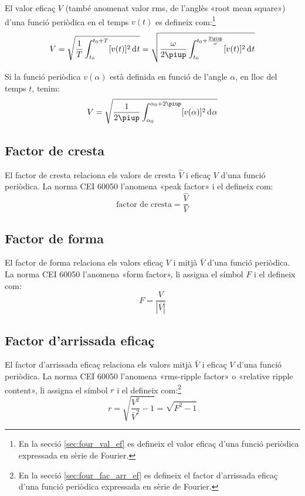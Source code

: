 El valor eficaç  $V$ (també anomenat valor rms, de l'anglès «root
mean square») d'una funció periòdica en el temps $v(t)$ es defineix com:\footnote{En la secció \ref{sec:four_val_ef} es defineix el valor eficaç d'una funció periòdica expressada en sèrie de Fourier.}
\begin{equation}
    V = \sqrt{\frac{1}{T} \int_{t_0}^{t_0+T} [v(t)]^2 \diff
    t} = \sqrt{\frac{\omega}{2\piup} \int_{t_0}^{t_0+\frac{2\piup}{\omega}}
     [v(t)]^2 \diff t}
\end{equation}

Si la funció periòdica $v(\alpha)$ està definida en funció de
l'angle $\alpha$, en lloc del temps $t$, tenim:
\begin{equation}
    V = \sqrt{\frac{1}{2\piup} \int_{\alpha_0}^{\alpha_0+2\piup}
     [v(\alpha)]^2 \diff \alpha}
\end{equation}

\subsection{Factor de cresta}

El factor de cresta relaciona els valors de cresta $\hat{V}$
  i eficaç $V$ d'una funció periòdica. La norma CEI 60050 l'anomena «peak factor» i el defineix com:
\begin{equation}
     \text{factor de cresta} = \frac{\hat{V}}{V}
\end{equation}

\subsection{Factor de forma}

El factor de forma relaciona els valors eficaç $V$
i mitjà $\bar{V}$ d'una funció periòdica. La norma CEI 60050 l'anomena «form factor», li assigna el símbol $F$ i el defineix com:
\begin{equation}
    F = \frac{V}{|\bar{V}|}
\end{equation}

\subsection{Factor d'arrissada eficaç}

El factor d'arrissada eficaç relaciona els
valors mitjà $\bar{V}$ i eficaç $V$ d'una funció periòdica.
La norma CEI 60050 l'anomena «rms-ripple factor» o «relative ripple content», li assigna el símbol $r$ i el defineix com:\footnote{En la secció \ref{sec:four_fac_arr_ef} es defineix el factor d'arrissada eficaç d'una funció periòdica expressada en sèrie de Fourier.}
\begin{equation}
    r = \sqrt{\frac{V^2}{\bar{V}^2}-1} = \sqrt{F^2-1}\label{eq:rms_rip}
\end{equation}

